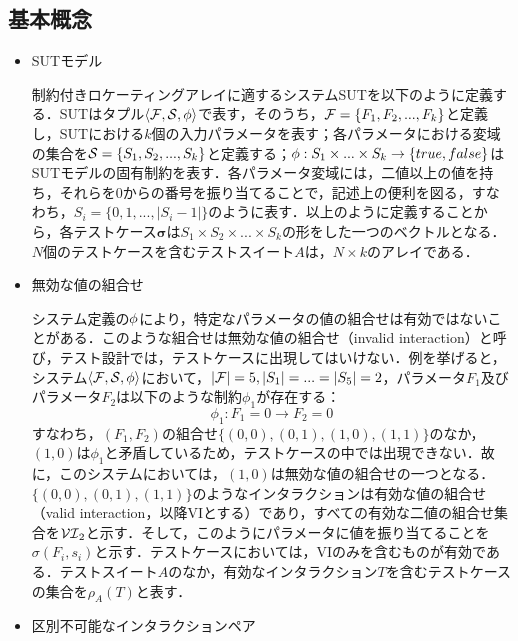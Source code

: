 \documentclass[paper]{ieicej}
\begin{document}
\subsection{基本概念}
\label{subsec:concept}
\begin{itemize}
\item SUTモデル

制約付きロケーティングアレイに適するシステムSUTを以下のように定義する．SUTはタプル$\langle\cal F,S,\phi\rangle$で表す，そのうち，${\cal F}=\{F_1, F_2, ..., F_k\}$と定義し，SUTにおける$k$個の入力パラメータを表す；各パラメータにおける変域の集合を${\cal S}=\{S_1, S_2, ..., S_k\}$と定義する；${\cal\phi}:S_1\times ... \times S_k\to \{true, false\}$はSUTモデルの固有制約を表す．各パラメータ変域には，二値以上の値を持ち，それらを0からの番号を振り当てることで，記述上の便利を図る，すなわち，$S_i=\{0, 1, ..., |S_i-1|\}$のように表す．以上のように定義することから，各テストケース$\boldsymbol\sigma$は$S_1\times S_2 \times ...\times S_k$の形をした一つのベクトルとなる．$N$個のテストケースを含むテストスイート$A$は，$N\times k$のアレイである．

\item 無効な値の組合せ

システム定義の$\cal \phi$により，特定なパラメータの値の組合せは有効ではないことがある．このような組合せは無効な値の組合せ（invalid interaction）と呼び，テスト設計では，テストケースに出現してはいけない．例を挙げると，システム$\langle\cal F,S,\phi\rangle$において，$|{\cal F}|=5, |S_1|=...=|S_5|=2$，パラメータ$F_1$及びパラメータ$F_2$は以下のような制約$\phi_1$が存在する：
\[ \phi_1 : F_1  =  0 \to F_2  =  0 \]
すなわち，$(F_1, F_2)$の組合せ$\{(0, 0), (0, 1), (1, 0), (1, 1)\}$のなか，$(1, 0)$は$\phi_1$と矛盾しているため，テストケースの中では出現できない．故に，このシステムにおいては，$(1, 0)$は無効な値の組合せの一つとなる．$\{(0, 0), (0, 1), (1, 1)\}$のようなインタラクションは有効な値の組合せ（valid interaction，以降VIとする）であり，すべての有効な二値の組合せ集合を${\cal VI}_2$と示す．そして，このようにパラメータに値を振り当てることを$\sigma(F_i, s_i)$と示す．テストケースにおいては，VIのみを含むものが有効である．テストスイート$A$のなか，有効なインタラクション$T$を含むテストケースの集合を$\rho_A(T)$と表す．

\item 区別不可能なインタラクションペア


\end{itemize}
\end{document}
